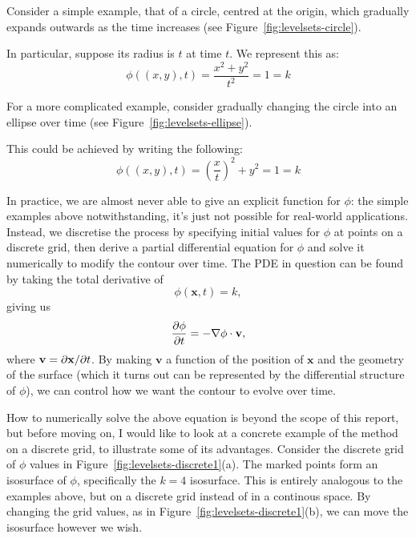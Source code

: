 Consider a simple example, that of a circle, centred at the origin, which gradually expands outwards as the time increases (see Figure~\ref{fig:levelsets-circle}).


In particular, suppose its radius is $t$ at time $t$. We represent this as:
%
\[
\phi((x,y), t) = \frac{x^2 + y^2}{t^2} = 1 = k
\]
%

For a more complicated example, consider gradually changing the circle into an ellipse over time (see Figure~\ref{fig:levelsets-ellipse}).


This could be achieved by writing the following:
%
\[
\phi((x,y), t) = \left(\frac{x}{t}\right)^2 + y^2 = 1 = k
\]
%

In practice, we are almost never able to give an explicit function for $\phi$: the simple examples above notwithstanding, it's just not possible for real-world applications. Instead, we discretise the process by specifying initial values for $\phi$ at points on a discrete grid, then derive a partial differential equation for $\phi$ and solve it numerically to modify the contour over time. The PDE in question can be found by taking the total derivative of
%
\[
\phi(\mathbf{x}, t) = k,
\]
%
giving us
%
\[
\frac{\partial \phi}{\partial t} = -\nabla\phi \cdot \mathbf{v},
\]
%
where $\mathbf{v} = \partial \mathbf{x}/\partial t$. By making $\mathbf{v}$ a function of the position of $\mathbf{x}$ and the geometry of the surface (which it turns out can be represented by the differential structure of $\phi$), we can control how we want the contour to evolve over time.

How to numerically solve the above equation is beyond the scope of this report, but before moving on, I would like to look at a concrete example of the method on a discrete grid, to illustrate some of its advantages. Consider the discrete grid of $\phi$ values in Figure~\ref{fig:levelsets-discrete1}(a). The marked points form an isosurface of $\phi$, specifically the $k = 4$ isosurface. This is entirely analogous to the examples above, but on a discrete grid instead of in a continous space. By changing the grid values, as in Figure~\ref{fig:levelsets-discrete1}(b), we can move the isosurface however we wish.

